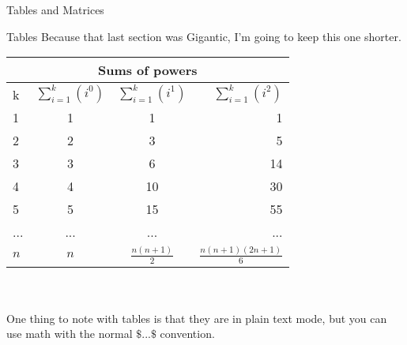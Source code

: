 \documentclass[onecolumn]{article}
\begin{document}
\begin{section}{Tables and Matrices}
	\begin{subsection}{Tables}
		Because that last section was {\Huge{Gigantic}}, I'm going to keep this one shorter.

		\large
		\begin{tabular}{l || c | c | r}
			\multicolumn{4}{c}{Sums of powers}	\\
			\hline 
			k & $\sum_{i=1}^{k}(i^0)$ & $\sum_{i=1}^{k}(i^1)$ & $\sum_{i=1}^{k}(i^2)$ \\
			\hline
			1 & 1 & 1 & 1 \\
			2 & 2 & 3 & 5 \\
			3 & 3 & 6 & 14 \\
			4 & 4 & 10 & 30 \\
			5 & 5 & 15 & 55 \\
			... & ... & ... & ... \\
			\hline
			$n$ & $n$ & $\frac{n(n+1)}{2}$ & $\frac{n(n+1)(2n+1)}{6}$
		\end{tabular}
		\\ \\
		One thing to note with tables is that they are in plain text mode, but you can use math with the normal $\texttt{\$...\$}$ convention.
	\end{subsection}
\end{section}
\end{document}
